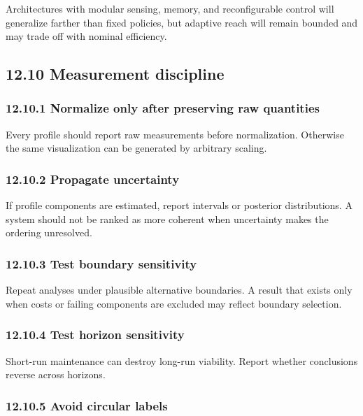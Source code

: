 \documentclass[
  11pt,
]{article}
\begin{document}
Architectures with modular sensing, memory, and reconfigurable control
will generalize farther than fixed policies, but adaptive reach will
remain bounded and may trade off with nominal efficiency.

\subsection{12.10 Measurement discipline}\label{measurement-discipline}

\subsubsection{12.10.1 Normalize only after preserving raw
quantities}\label{normalize-only-after-preserving-raw-quantities}

Every profile should report raw measurements before normalization.
Otherwise the same visualization can be generated by arbitrary scaling.

\subsubsection{12.10.2 Propagate
uncertainty}\label{propagate-uncertainty}

If profile components are estimated, report intervals or posterior
distributions. A system should not be ranked as more coherent when
uncertainty makes the ordering unresolved.

\subsubsection{12.10.3 Test boundary
sensitivity}\label{test-boundary-sensitivity}

Repeat analyses under plausible alternative boundaries. A result that
exists only when costs or failing components are excluded may reflect
boundary selection.

\subsubsection{12.10.4 Test horizon
sensitivity}\label{test-horizon-sensitivity}

Short-run maintenance can destroy long-run viability. Report whether
conclusions reverse across horizons.

\subsubsection{12.10.5 Avoid circular
labels}\label{avoid-circular-labels}
\end{document}
